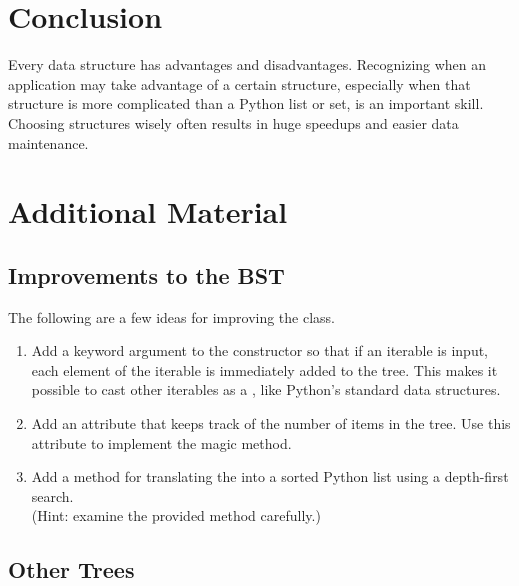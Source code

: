 \section*{Conclusion} %

Every data structure has advantages and disadvantages.
Recognizing when an application may take advantage of a certain structure, especially when that structure is more complicated than a Python list or set, is an important skill.
Choosing structures wisely often results in huge speedups and easier data maintenance.

\newpage

\section*{Additional Material} %

\subsection*{Improvements to the BST} %

The following are a few ideas for improving the  class.

\begin{enumerate}
\item Add a keyword argument to the constructor so that if an iterable is input, each element of the iterable is immediately added to the tree.
This makes it possible to cast other iterables as a , like
Python's standard data structures.
\item Add an attribute that keeps track of the number of items in the tree.
Use this attribute to implement the  magic method.
\item Add a method for translating the  into a sorted Python list using a depth-first search.
\\(Hint: examine the provided  method carefully.)
\end{enumerate}

\subsection*{Other Trees} %

